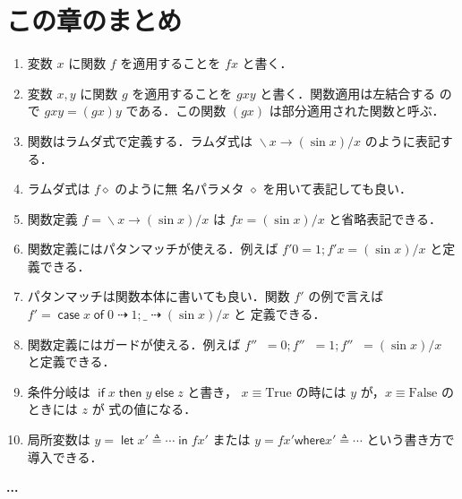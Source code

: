 \documentclass[a5paper,twoside,fleqn,draft]{jsbook}
\newcommand{\programminglanguage}[1]{\textsf{#1}}
\newcommand{\clang}{\programminglanguage{C}}
\newcommand{\haskell}{\programminglanguage{Haskell}}
\newenvironment{note}[1]{\begin{boxnote}\begin{center}\textbf{#1}\end{center}}{\end{boxnote}}
\newcommand{\code}[1]{\texttt{#1}}
\newenvironment{ccode}{\begin{itembox}[r]{\clang}}{\end{itembox}}
\newcommand{\mKeyword}[1]{\mathsf{#1}} %
\newcommand{\mIfKeyword}{\mKeyword{if}}
\newcommand{\mCaseKeyword}{\mKeyword{case}}
\newcommand{\mElseKeyword}{\mKeyword{else}}
\newcommand{\mInKeyword}{\mKeyword{in}}
\newcommand{\mLetKeyword}{\mKeyword{let}}
\newcommand{\mOfKeyword}{\mKeyword{of}}
\newcommand{\mOtherwiseKeyword}{\mKeyword{otherwise}}
\newcommand{\mThenKeyword}{\mKeyword{then}}
\newcommand{\mWhereKeyword}{\mKeyword{where}}
\DeclareMathOperator{\mCaseKW}{\mCaseKeyword} %
\DeclareMathOperator{\mElse}{\mElseKeyword}
\DeclareMathOperator{\mIf}{\mIfKeyword}
\DeclareMathOperator{\mInKW}{\mInKeyword} %
\DeclareMathOperator{\mLetKW}{\mLetKeyword} %
\DeclareMathOperator{\mOfKW}{\mOfKeyword} %
\DeclareMathOperator{\mOtherwise}{\mOtherwiseKeyword}
\DeclareMathOperator{\mThen}{\mThenKeyword}
\newcommand{\mSpecialConstant}[1]{\textrm{#1}} %
\newcommand{\mFalse}{\mSpecialConstant{False}}
\newcommand{\mTrue}{\mSpecialConstant{True}}
\newcommand{\mAnyParam}{\_}
\newcommand{\mAnonParam}{\diamond}
\DeclareMathOperator{\mIfSo}{\dashrightarrow}
\DeclareMathOperator{\mLambda}{\backslash}
\DeclareMathOperator{\mLambdaArrow}{\rightarrow}
\DeclareMathOperator{\mLetEq}{\triangleq}
\newcommand{\mGuard}[1]{\mathop{\mid_{#1}}}
\newcommand{\mCaseOf}[1]{\mCaseKW#1\mOfKW}
\newcommand{\mIfThenElse}[3]{\mIf{#1}\mThen{#2}\mElse{#3}}
\newcommand{\mLambdaExp}[2]{\mLambda{#1}\mLambdaArrow{#2}}
\newcommand{\mLetIn}[3]{\mLetKW#1\mLetEq#2\mInKW{#3}}
\newcommand{\mWhereIs}[2]{\mathbin{\mWhereKeyword}#1\mLetEq#2}
\begin{document}
\section{この章のまとめ}

\begin{enumerate}
\item 変数 $x$ に関数 $f$ を適用することを $fx$ と書く．\item 変数
$x,y$ に関数 $g$ を適用することを $gxy$ と書く．関数適用は左結合する
ので $gxy=(gx)y$ である．この関数 $(gx)$ は部分適用された関数と呼ぶ．
\item 関数はラムダ式で定義する．ラムダ式は $\mLambdaExp{x}{(\sin
x)/x}$ のように表記する．\item ラムダ式は $f\mAnonParam$ のように無
名パラメタ $\mAnonParam$ を用いて表記しても良い．\item 関数定義
$f=\mLambdaExp{x}{(\sin x)/x}$ は $fx=(\sin x)/x$ と省略表記できる．
\item 関数定義にはパタンマッチが使える．例えば $f'0=1;f'x=(\sin x)/x$
と定義できる．\item パタンマッチは関数本体に書いても良い．関数 $f'$
の例で言えば $f'=\mCaseOf{x}0\mIfSo1;\mAnyParam\mIfSo(\sin x)/x$ と
定義できる．\item 関数定義にはガードが使える．例えば
$f''\mGuard{x<0}=0;f''\mGuard{x\equiv0}=1;f''\mGuard{\mOtherwise}=(\sin
x)/x$ と定義できる．\item 条件分岐は $\mIfThenElse{x}{y}{z}$ と書き，
$x\equiv\mTrue$ の時には $y$ が，$x\equiv\mFalse$ のときには $z$ が
式の値になる．\item 局所変数は $y=\mLetIn{x'}{\dotsb}{fx'}$ または
$y=fx'\mWhereIs{x'}{\dotsb}$ という書き方で導入できる．
\end{enumerate}



\begin{note}{...}%
\end{note}
\end{document}
